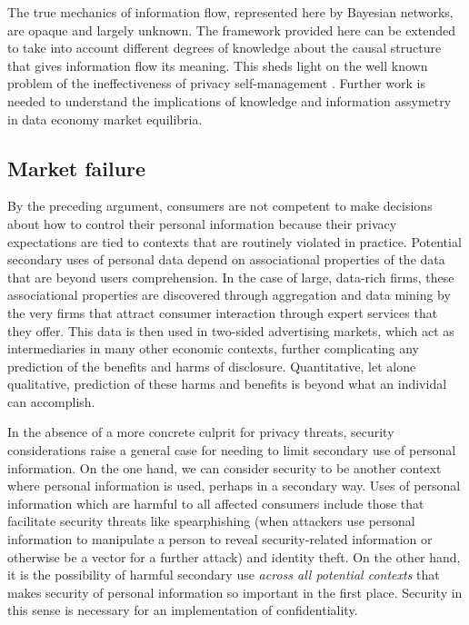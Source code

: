 \documentclass[../thesis.tex]{subfiles}
\begin{document}
The true mechanics of information flow, represented here
by Bayesian networks, are opaque and largely unknown.
The framework provided here can be extended to take into
account different degrees of knowledge about the causal
structure that gives information flow its meaning.
This sheds light on the well known problem of
the ineffectiveness of privacy self-management
\cite{solove2012introduction}.
Further work is needed to understand the implications
of knowledge and information assymetry in data economy
market equilibria.

\subsection{Market failure}

By the preceding argument, consumers are not competent
to make decisions about how to control their personal
information because their privacy expectations are
tied to contexts that are routinely violated in practice.
Potential secondary uses of personal data depend on
associational properties of the data that are beyond
users comprehension.
In the case of large, data-rich firms,
these associational properties are
discovered through aggregation and data mining by the
very firms that attract consumer interaction through
expert services that they offer.
This data is then used in two-sided advertising markets, which
act as intermediaries in many other economic contexts,
further complicating any prediction of the benefits
and harms of disclosure.
Quantitative, let alone qualitative, prediction of
these harms and benefits is beyond what an individal
can accomplish.

In the absence of a more concrete culprit for privacy threats,
security considerations raise a general case for needing
to limit secondary use of personal information.
On the one hand, we can consider security to be another
context where personal information is used, perhaps in a
secondary way.
Uses of personal information which are
harmful to all affected consumers include those that facilitate
security threats like spearphishing (when attackers use
personal information to manipulate a person to reveal 
security-related information or otherwise be a vector
for a further attack) and identity theft.
On the other hand, it is the possibility of harmful secondary
use \emph{across all potential contexts} that makes security of
personal information so important in the first place.
Security in this sense is necessary for an implementation of 
confidentiality.
\end{document}
